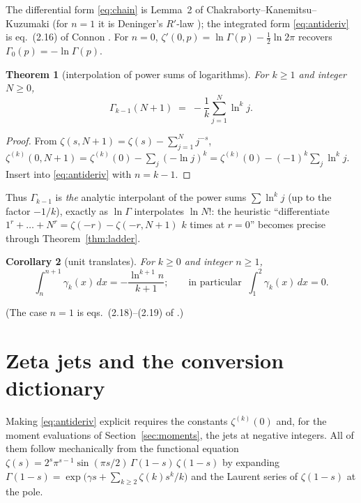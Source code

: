 \documentclass[11pt]{article}
\newtheorem{theorem}{Theorem}[section]
\newtheorem{corollary}[theorem]{Corollary}
\theoremstyle{remark}
\newcommand{\lntwopi}{\ln 2\pi}
\begin{document}
The differential form \eqref{eq:chain} is Lemma~2 of
Chakraborty--Kanemitsu--Kuzumaki \cite{CKK} (for $n=1$ it is Deninger's
$R'$-law \cite{Deninger}); the integrated form \eqref{eq:antideriv} is
eq.~(2.16) of Connon \cite{Connon}. For $n=0$,
$\zeta'(0,p)=\ln\Gamma(p)-\tfrac12\lntwopi$ recovers
$\Gamma_{\!0}(p)=-\ln\Gamma(p)$.

\begin{theorem}[interpolation of power sums of logarithms]\label{thm:interp}
For $k\ge1$ and integer $N\ge0$,
\[
\Gamma_{\!k-1}(N+1)\;=\;-\frac1k\sum_{j=1}^{N}\ln^k j .
\]
\end{theorem}

\begin{proof}
From $\zeta(s,N+1)=\zeta(s)-\sum_{j=1}^N j^{-s}$,
$\zeta^{(k)}(0,N+1)=\zeta^{(k)}(0)-\sum_j(-\ln j)^k
=\zeta^{(k)}(0)-(-1)^k\sum_j\ln^k j$. Insert into \eqref{eq:antideriv} with
$n=k-1$.
\end{proof}

Thus $\Gamma_{\!k-1}$ is \emph{the} analytic interpolant of the power sums
$\sum\ln^k j$ (up to the factor $-1/k$), exactly as $\ln\Gamma$ interpolates
$\ln N!$: the heuristic ``differentiate $1^r+\dots+N^r=\zeta(-r)-\zeta(-r,N+1)$
$k$ times at $r=0$'' becomes precise through
Theorem~\ref{thm:ladder}.

\begin{corollary}[unit translates]\label{cor:translates}
For $k\ge0$ and integer $n\ge1$,
\[
\int_n^{n+1}\gamma_k(x)\,dx=-\frac{\ln^{k+1}n}{k+1};
\qquad\text{in particular }\ \int_1^2\gamma_k(x)\,dx=0 .
\]
\end{corollary}

\noindent
(The case $n=1$ is eqs.~(2.18)--(2.19) of \cite{Connon}.)

\section{Zeta jets and the conversion dictionary}\label{sec:jets}

Making \eqref{eq:antideriv} explicit requires the constants
$\zeta^{(k)}(0)$ and, for the moment evaluations of
Section~\ref{sec:moments}, the jets at negative integers. All of them follow
mechanically from the functional equation
$\zeta(s)=2^s\pi^{s-1}\sin(\pi s/2)\,\Gamma(1-s)\,\zeta(1-s)$
by expanding $\Gamma(1-s)=\exp\bigl(\gamma s+\sum_{k\ge2}\zeta(k)s^k/k\bigr)$
and the Laurent series of $\zeta(1-s)$ at the pole.
\end{document}
